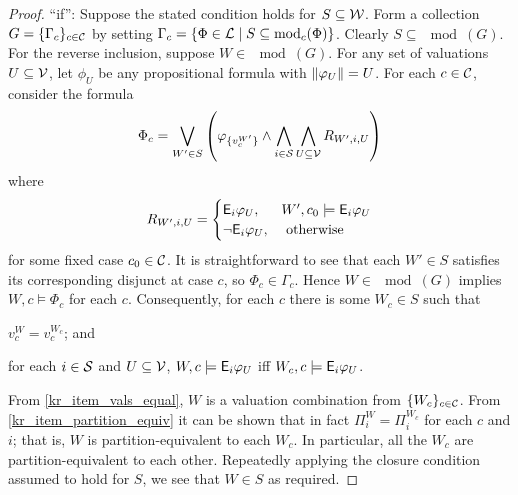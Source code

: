 \begin{proof}
    ``if'': Suppose the stated condition holds for $S \subseteq \mathcal{W}$. Form a
    collection $G = \{\Gamma_c\}_{c \in \mathcal{C}}$ by setting $\Gamma_c = \{\Phi \in
    \mathcal{L}{} \mid S \subseteq \operatorname{mod}_c(\Phi)\}$. Clearly $S \subseteq \mod(G)$. For the
    reverse inclusion, suppose $W \in \mod(G)$. For any set of valuations $U
    \subseteq \mathcal{V}$, let $\phi_U$ be any propositional formula with
    $\|{\varphi_U}\| = U$. For each $c \in \mathcal{C}$, consider the formula
    \[
        \Phi_c = \bigvee_{W' \in S}\left(
            \varphi_{\{v^{W'}_c\}}
            \land
            \bigwedge_{i \in \mathcal{S}}
                \bigwedge_{U \subseteq \mathcal{V}}
                    R_{W', i, U}
        \right)
    \]
    where
    \[
        R_{W', i, U} = \begin{cases}
            \mathsf{E}_i{\varphi_U},& W', c_0 \models \mathsf{E}_i{\varphi_U} \\
            \neg \mathsf{E}_i{\varphi_U},& \text{ otherwise }
        \end{cases}
    \]
    for some fixed case $c_0 \in \mathcal{C}$. It is straightforward to see that each
    $W' \in S$ satisfies its corresponding disjunct at case $c$, so $\Phi_c \in
    \Gamma_c$. Hence $W \in \mod(G)$ implies $W, c \models \Phi_c$ for each $c$.
    Consequently, for each $c$ there is some $W_c \in S$ such that
    \begin{inlinelist}
        \item \label{kr_item_vals_equal} $v^W_c = v^{W_c}_c$; and
        \item \label{kr_item_partition_equiv} for each $i \in \mathcal{S}$ and $U \subseteq
              \mathcal{V}$, $W, c \models \mathsf{E}_i{\varphi_U}$ iff $W_c, c \models \mathsf{E}_i{\varphi_U}$.
    \end{inlinelist}
    From \ref{kr_item_vals_equal}, $W$ is a valuation combination from $\{W_c\}_{c
    \in \mathcal{C}}$. From \ref{kr_item_partition_equiv} it can be shown that in fact
    $\Pi^W_i = \Pi^{W_c}_i$ for each $c$ and $i$; that is, $W$ is
    partition-equivalent to each $W_c$. In particular, all the $W_c$ are
    partition-equivalent to each other.
    Repeatedly applying the closure condition assumed to hold for $S$, we see
    that $W \in S$ as required.


\end{proof}
